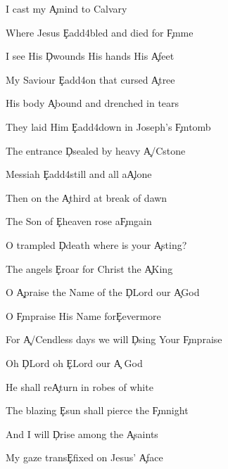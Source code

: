 \documentclass[9pt]{extarticle}
\begin{document}
\bsong

\bv
I cast my \c{A}mind to Calvary

Where Jesus \c{Eadd4}bled and died for \c{F\s m}me

I see His \c{D}wounds His hands His \c{A}feet

My Saviour \c{Eadd4}on that cursed \c{A}tree
\ev

\bv
His body \c{A}bound and drenched in tears

They laid Him \c{Eadd4}down in Joseph's \c{F\s m}tomb

The entrance \c{D}sealed by heavy \c{A/C\s }stone

Messiah \c{Eadd4}still and all a\c{A}lone
\ev

\bv
Then on the \c{A}third at break of dawn

The Son of \c{E}heaven rose a\c{F\s m}gain

O trampled \c{D}death where is your \c{A}sting?

The angels \c{E}roar for Christ the \c{A}King
\ev

\bc
O \c{A}praise the Name of the \c{D}Lord our \c{A}God

O \c{F\s m}praise His Name for\c{E}evermore

For \c{A/C\s }endless days we will \c{D}sing Your \c{F\s m}praise

Oh \c{D}Lord oh \c{E}Lord our \c{A} God
\ec

\bv
He shall re\c{A}turn in robes of white

The blazing \c{E}sun shall pierce the \c{F\s m}night

And I will \c{D}rise among the \c{A}saints

My gaze trans\c{E}fixed on Jesus' \c{A}face
\ev


\esong
\end{document}
